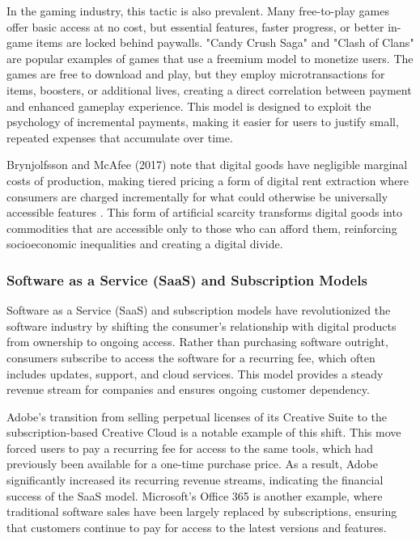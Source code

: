 \begin{refsection}
In the gaming industry, this tactic is also prevalent. Many free-to-play games offer basic access at no cost, but essential features, faster progress, or better in-game items are locked behind paywalls. "Candy Crush Saga" and "Clash of Clans" are popular examples of games that use a freemium model to monetize users. The games are free to download and play, but they employ microtransactions for items, boosters, or additional lives, creating a direct correlation between payment and enhanced gameplay experience. This model is designed to exploit the psychology of incremental payments, making it easier for users to justify small, repeated expenses that accumulate over time.

Brynjolfsson and McAfee (2017) note that digital goods have negligible marginal costs of production, making tiered pricing a form of digital rent extraction where consumers are charged incrementally for what could otherwise be universally accessible features \cite[pp.~72-74]{brynjolfsson2017second}. This form of artificial scarcity transforms digital goods into commodities that are accessible only to those who can afford them, reinforcing socioeconomic inequalities and creating a digital divide.

\subsubsection{Software as a Service (SaaS) and Subscription Models}

Software as a Service (SaaS) and subscription models have revolutionized the software industry by shifting the consumer's relationship with digital products from ownership to ongoing access. Rather than purchasing software outright, consumers subscribe to access the software for a recurring fee, which often includes updates, support, and cloud services. This model provides a steady revenue stream for companies and ensures ongoing customer dependency.

Adobe's transition from selling perpetual licenses of its Creative Suite to the subscription-based Creative Cloud is a notable example of this shift. This move forced users to pay a recurring fee for access to the same tools, which had previously been available for a one-time purchase price. As a result, Adobe significantly increased its recurring revenue streams, indicating the financial success of the SaaS model. Microsoft's Office 365 is another example, where traditional software sales have been largely replaced by subscriptions, ensuring that customers continue to pay for access to the latest versions and features.


\end{refsection}
